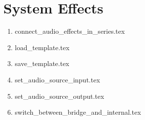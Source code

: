 \section{System Effects}

\begin{enumerate}


\item connect\_audio\_effects\_in\_series.tex
\item load\_template.tex
\item save\_template.tex
\item set\_audio\_source\_input.tex
\item set\_audio\_source\_output.tex
\item switch\_between\_bridge\_and\_internal.tex


\end{enumerate}
